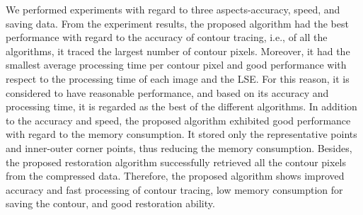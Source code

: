 We performed experiments with regard to three aspects-accuracy, speed, and saving data. From the experiment results, the proposed algorithm had the best performance with regard to the accuracy of contour tracing, i.e., of all the algorithms, it traced the largest number of contour pixels. Moreover, it had the smallest average processing time per contour pixel and good performance with respect to the processing time of each image and the LSE. For this reason, it is considered to have reasonable performance, and based on its accuracy and processing time, it is regarded as the best of the different algorithms. In addition to the accuracy and speed, the proposed algorithm exhibited good performance with regard to the memory consumption. It stored only the representative points and inner-outer corner points, thus reducing the memory consumption. Besides, the proposed restoration algorithm successfully retrieved all the contour pixels from the compressed data. Therefore, the proposed algorithm shows improved accuracy and fast processing of contour tracing, low memory consumption for saving the contour, and good restoration ability.